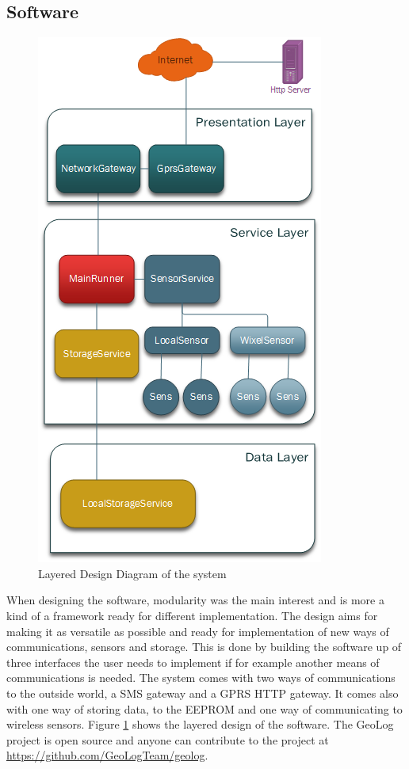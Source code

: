 \subsection{Software}
\begin{figure}
\centering
\includegraphics[width=0.6\linewidth]{graphics/Layering}
\caption{Layered Design Diagram of the system\label{fig:Layering}}
\end{figure}
When designing the software, modularity was the main interest and is more a kind of
a framework ready for different implementation. The design aims for making
it as versatile as possible and ready for implementation of new ways of communications, sensors and storage. This is done by building the software up of three interfaces the user needs to implement if for example another means of communications is needed. The system comes with two ways of communications to the outside world, a SMS gateway and a GPRS HTTP gateway. It comes also with one way of storing data, to the EEPROM and one way of communicating to wireless sensors. Figure \ref{fig:Layering} shows the layered design of the software. The GeoLog project is open source and anyone can contribute
to the project at \url{https://github.com/GeoLogTeam/geolog}.


